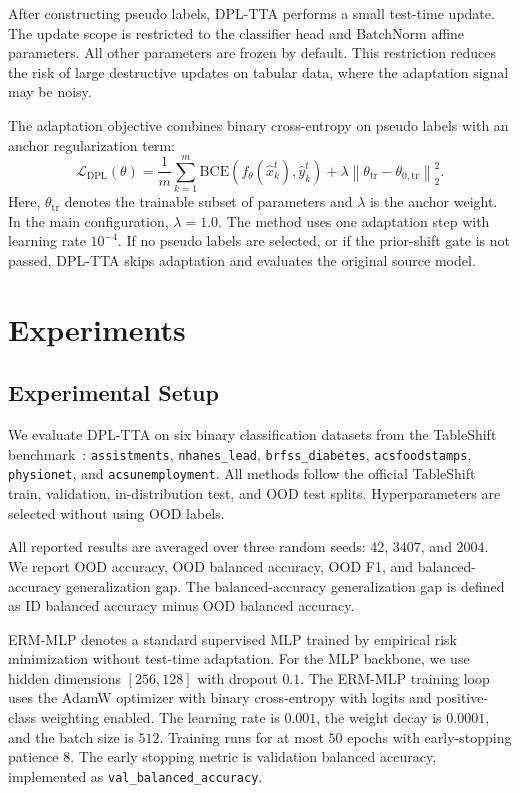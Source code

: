\documentclass{article}
\begin{document}
After constructing pseudo labels, DPL-TTA performs a small test-time update. The update scope is restricted to the classifier head and BatchNorm affine parameters. All other parameters are frozen by default. This restriction reduces the risk of large destructive updates on tabular data, where the adaptation signal may be noisy.

The adaptation objective combines binary cross-entropy on pseudo labels with an anchor regularization term:
\begin{equation}
\mathcal{L}_{\mathrm{DPL}}(\theta)
=
\frac{1}{m}
\sum_{k=1}^{m}
\mathrm{BCE}\!\left(f_{\theta}(\hat{x}_k^{t}), \hat{y}_k^{t}\right)
+
\lambda
\left\|
\theta_{\mathrm{tr}}
-
\theta_{0,\mathrm{tr}}
\right\|_2^2 .
\label{eq:dpl_loss}
\end{equation}
Here, $\theta_{\mathrm{tr}}$ denotes the trainable subset of parameters and $\lambda$ is the anchor weight. In the main configuration, $\lambda=1.0$. The method uses one adaptation step with learning rate $10^{-4}$. If no pseudo labels are selected, or if the prior-shift gate is not passed, DPL-TTA skips adaptation and evaluates the original source model.

\section{Experiments}

\subsection{Experimental Setup}

We evaluate DPL-TTA on six binary classification datasets from the TableShift benchmark~\citep{gardner2023tableshift}:
\texttt{assistments}, \texttt{nhanes\_lead}, \texttt{brfss\_diabetes}, \texttt{acsfoodstamps}, \texttt{physionet}, and \texttt{acsunemployment}. All methods follow the official TableShift train, validation, in-distribution test, and OOD test splits. Hyperparameters are selected without using OOD labels.

All reported results are averaged over three random seeds: $42$, $3407$, and $2004$. We report OOD accuracy, OOD balanced accuracy, OOD F1, and balanced-accuracy generalization gap. The balanced-accuracy generalization gap is defined as ID balanced accuracy minus OOD balanced accuracy.

ERM-MLP denotes a standard supervised MLP trained by empirical risk minimization without test-time adaptation. For the MLP backbone, we use hidden dimensions $[256, 128]$ with dropout $0.1$. The ERM-MLP training loop uses the AdamW optimizer with binary cross-entropy with logits and positive-class weighting enabled. The learning rate is $0.001$, the weight decay is $0.0001$, and the batch size is $512$. Training runs for at most $50$ epochs with early-stopping patience $8$. The early stopping metric is validation balanced accuracy, implemented as \texttt{val\_balanced\_accuracy}.
\end{document}
